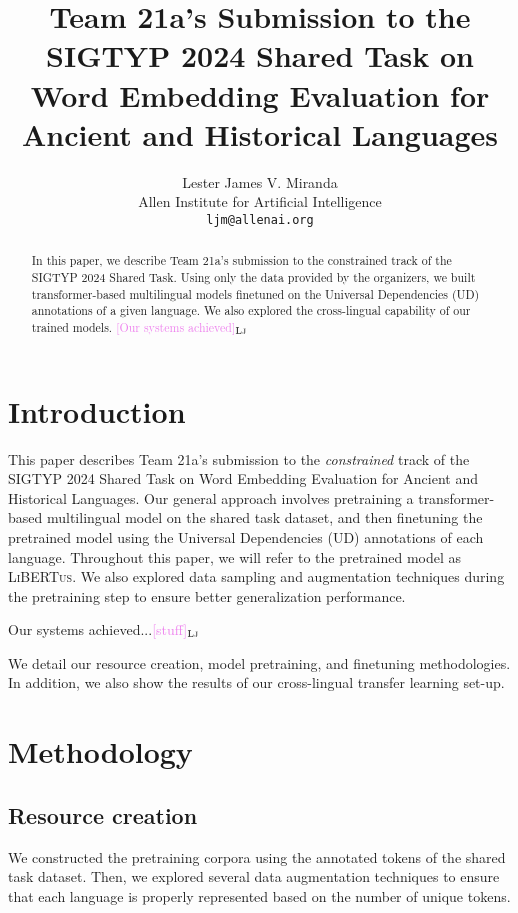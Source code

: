 \documentclass[11pt]{article}
\title{Team 21a's Submission to the SIGTYP 2024 Shared Task on Word Embedding Evaluation for Ancient and Historical Languages}
\author{Lester James V. Miranda \\
  Allen Institute for Artificial Intelligence \\
  \texttt{ljm@allenai.org} \\
}
\newcommand{\draftonly}[1]{#1}
\newcommand{\draftcomment}[3]{\draftonly{\textcolor{#2}{[#3]{$_{\textsc{#1}}$}}}}
\newcommand{\lj}[1]{\draftcomment{Lj}{violet}{#1}}
\newcommand{\libertus}{\textsc{LiBERTus}}
\begin{document}
\maketitle

\begin{abstract}
In this paper, we describe Team 21a's submission to the constrained track of the SIGTYP 2024 Shared Task.
Using only the data provided by the organizers, we built transformer-based multilingual models finetuned on the Universal Dependencies (UD) annotations of a given language.
We also explored the cross-lingual capability of our trained models.
\lj{Our systems achieved}
\end{abstract}

\section{Introduction}
This paper describes Team 21a's submission to the \textit{constrained} track of the SIGTYP 2024 Shared Task on Word Embedding Evaluation for Ancient and Historical Languages.
Our general approach involves pretraining a transformer-based multilingual model on the shared task dataset, and then finetuning the pretrained model using the Universal Dependencies (UD) annotations of each language.
Throughout this paper, we will refer to the pretrained model as \libertus{}.
We also explored data sampling and augmentation techniques during the pretraining step to ensure better generalization performance.

Our systems achieved...\lj{stuff}


We detail our resource creation, model pretraining, and finetuning methodologies.
In addition, we also show the results of our cross-lingual transfer learning set-up.

\section{Methodology}

% 
% 


\subsection{Resource creation}

We constructed the pretraining corpora using the annotated tokens of the shared task dataset.
Then, we explored several data augmentation techniques to ensure that each language is properly represented based on the number of unique tokens.
\end{document}

